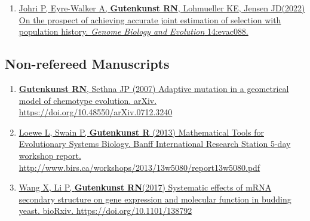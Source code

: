 \documentclass[11pt]{article}
\begin{document}
\begin{enumerate}
\item \href{https://doi.org/10.1093/gbe/evac088}{Johri P\corresponding, Eyre-Walker A, \textbf{Gutenkunst RN}, Lohmueller KE, Jensen JD\corresponding (2022) On the prospect of achieving accurate joint estimation of selection with population history. \emph{Genome Biology and Evolution} 14:evac088.}


\end{enumerate}


\subsection*{Non-refereed Manuscripts}
\begin{enumerate}
\item \href{
https://doi.org/10.48550/arXiv.0712.3240}{\grad \textbf{Gutenkunst RN}, Sethna JP (2007) Adaptive mutation in a geometrical model of chemotype evolution. arXiv.
https://doi.org/10.48550/arXiv.0712.3240}

\item \href{http://www.birs.ca/workshops/2013/13w5080/report13w5080.pdf}{Loewe L, Swain P, \textbf{Gutenkunst R} (2013) Mathematical Tools for Evolutionary Systems Biology. Banff International Research Station 5-day workshop report.\\http://www.birs.ca/workshops/2013/13w5080/report13w5080.pdf}

\item \href{https://doi.org/10.1101/138792}{Wang X\trainee, Li P, \textbf{Gutenkunst RN}\corresponding (2017) Systematic effects of mRNA secondary structure on gene expression and molecular function in budding yeast. bioRxiv. https://doi.org/10.1101/138792}

\end{enumerate}
\end{document}
